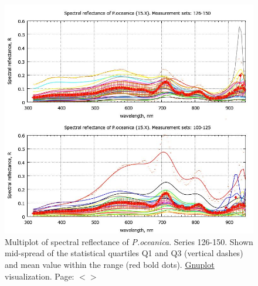 \documentclass[11pt]{article}
\begin{document}
\begin{figure}[H]
	\begin{center}
		\includegraphics[scale=0.5]{GNU-14.jpg}
		\caption{Multiplot of spectral reflectance of \textit{P.oceanica}. Series 126-150. Shown mid-spread of the statistical quartiles Q1 and Q3 (vertical dashes) and mean value within the range (red bold dots). \href{http://www.gnuplot.info/}{Gnuplot} visualization. Page: $<$\pageref{page-39}$>$­}
		\label{fig:A.27}
	\end{center}
\end{figure}
\end{document}
